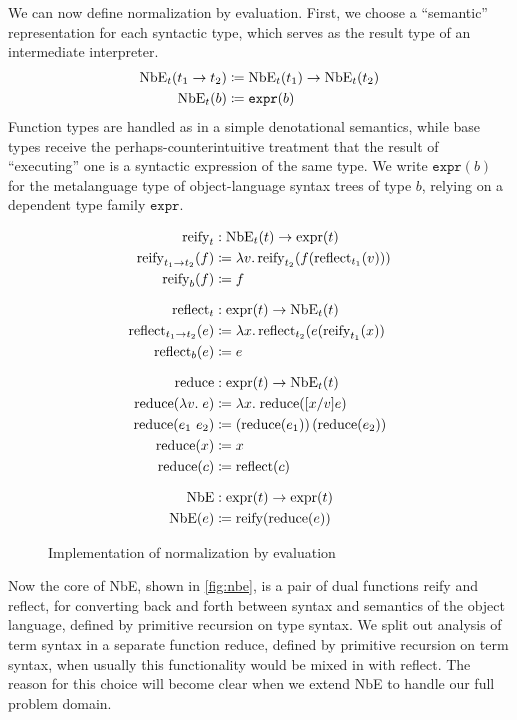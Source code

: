 We can now define normalization by evaluation.
First, we choose a ``semantic'' representation for each syntactic type, which serves as the result type of an intermediate interpreter.
\begin{align*}
  \text{NbE}_t(t_1 \to t_2) & \coloneqq \text{NbE}_t(t_1) \to \text{NbE}_t(t_2) \\
  \text{NbE}_t(b) & \coloneqq \texttt{expr}(b)
\end{align*}
Function types are handled as in a simple denotational semantics, while base types receive the perhaps-counterintuitive treatment that the result of ``executing'' one is a syntactic expression of the same type.
We write $\texttt{expr}(b)$ for the metalanguage type of object-language syntax trees of type $b$, relying on a dependent type family $\texttt{expr}$.

\begin{figure}
\begin{align*}
  \text{reify}_t & : \text{NbE}_t(t) \to \text{expr}(t) \\
  \text{reify}_{t_1 \to t_2}(f) & \defeq \lambda v.\,\text{reify}_{t_2}(f(\text{reflect}_{t_1}(v))) \\
  \text{reify}_{b}(f) & \defeq f \\ \noalign{\vskip7pt}
  \text{reflect}_t & : \text{expr}(t) \to \text{NbE}_t(t) \\
  \text{reflect}_{t_1\to t_2}(e) & \defeq \lambda x.\,\text{reflect}_{t_2}(e(\text{reify}_{t_1}(x)) \\
  \text{reflect}_{b}(e) & \defeq e \\ \noalign{\vskip7pt}
  \text{reduce} & : \text{expr}(t) \to \text{NbE}_t(t) \\
  \text{reduce}(\lambda v. \; e) & \defeq \lambda x. \; \text{reduce}([x/v]e) \\
  \text{reduce}(e_1~e_2) & \defeq \left(\text{reduce}(e_1)\right)(\text{reduce}(e_2)) \\
  \text{reduce}(x) & \defeq x \\
  \text{reduce}(c) & \defeq \text{reflect}(c) \\ \noalign{\vskip7pt}
  \text{NbE} & : \text{expr}(t) \to \text{expr}(t) \\
  \text{NbE}(e) & \defeq \text{reify}(\text{reduce}(e))
\end{align*}
\caption{\label{fig:nbe}Implementation of normalization by evaluation}
\end{figure}

Now the core of NbE, shown in \autoref{fig:nbe}, is a pair of dual functions reify and reflect, for converting back and forth between syntax and semantics of the object language, defined by primitive recursion on type syntax.
We split out analysis of term syntax in a separate function reduce, defined by primitive recursion on term syntax, when usually this functionality would be mixed in with reflect.
The reason for this choice will become clear when we extend NbE to handle our full problem domain.

